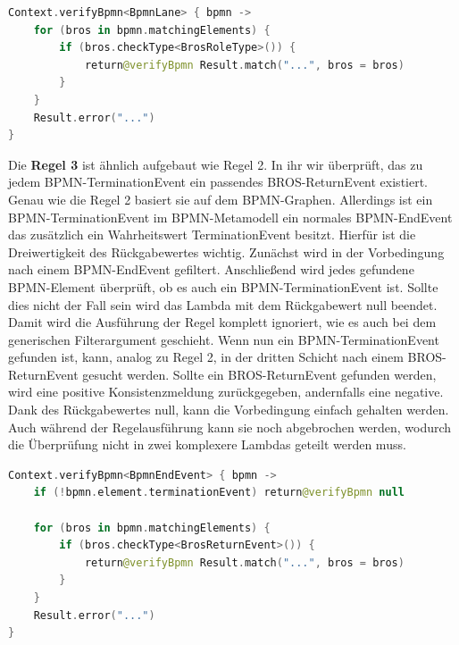 \begin{lstlisting}[language=Kotlin, caption=Implementierung von Regel 2, label=lst:implementation_rule_2]
Context.verifyBpmn<BpmnLane> { bpmn ->
    for (bros in bpmn.matchingElements) {
        if (bros.checkType<BrosRoleType>()) {
            return@verifyBpmn Result.match("...", bros = bros)
        }
    }
    Result.error("...")
}
\end{lstlisting}

Die \textbf{Regel 3} ist ähnlich aufgebaut wie Regel 2.
In ihr wir überprüft, das zu jedem BPMN-TerminationEvent ein passendes BROS-ReturnEvent existiert.
Genau wie die Regel 2 basiert sie auf dem BPMN-Graphen.
Allerdings ist ein BPMN-TerminationEvent im BPMN-Metamodell ein normales BPMN-EndEvent das zusätzlich ein Wahrheitswert TerminationEvent besitzt.
Hierfür ist die Dreiwertigkeit des Rückgabewertes wichtig.
Zunächst wird in der Vorbedingung nach einem BPMN-EndEvent gefiltert.
Anschließend wird jedes gefundene BPMN-Element überprüft, ob es auch ein BPMN-TerminationEvent ist.
Sollte dies nicht der Fall sein wird das Lambda mit dem Rückgabewert null beendet.
Damit wird die Ausführung der Regel komplett ignoriert, wie es auch bei dem generischen Filterargument geschieht.
Wenn nun ein BPMN-TerminationEvent gefunden ist, kann, analog zu Regel 2, in der dritten Schicht nach einem BROS-ReturnEvent gesucht werden.
Sollte ein BROS-ReturnEvent gefunden werden, wird eine positive Konsistenzmeldung zurückgegeben, andernfalls eine negative.
Dank des Rückgabewertes null, kann die Vorbedingung einfach gehalten werden.
Auch während der Regelausführung kann sie noch abgebrochen werden, wodurch die Überprüfung nicht in zwei komplexere Lambdas geteilt werden muss.

\begin{lstlisting}[language=Kotlin, caption=Implementierung von Regel 3, label=lst:implementation_rule_3]
Context.verifyBpmn<BpmnEndEvent> { bpmn ->
    if (!bpmn.element.terminationEvent) return@verifyBpmn null

    for (bros in bpmn.matchingElements) {
        if (bros.checkType<BrosReturnEvent>()) {
            return@verifyBpmn Result.match("...", bros = bros)
        }
    }
    Result.error("...")
}
\end{lstlisting}

